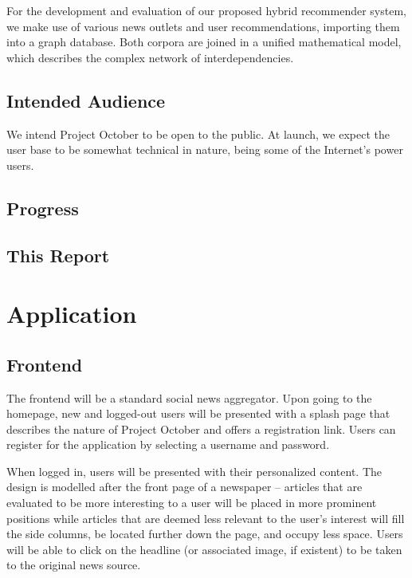 \documentclass[11pt,letterpaper]{article}
\begin{document}
For the development and evaluation of our proposed hybrid recommender system, we make use of various news outlets and user recommendations, importing them into a graph database.
Both corpora are joined in a unified mathematical model, which describes the complex network of interdependencies.

\subsection{Intended Audience}
We intend Project October to be open to the public.
At launch, we expect the user base to be somewhat technical in nature, being some of the Internet's power users.

\subsection{Progress}

\subsection{This Report}

\section{Application}
\subsection{Frontend}
The frontend will be a standard social news aggregator.
Upon going to the homepage, new and logged-out users will be presented with a splash page that describes the nature of Project October and offers a registration link.
Users can register for the application by selecting a username and password.

When logged in, users will be presented with their personalized content.
The design is modelled after the front page of a newspaper -- articles that are evaluated to be more interesting to a user will be placed in more prominent positions while articles that are deemed less relevant to the user's interest will fill the side columns, be located further down the page, and occupy less space.
Users will be able to click on the headline (or associated image, if existent) to be taken to the original news source.
\end{document}

